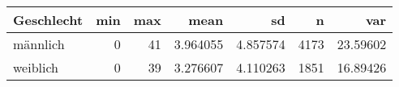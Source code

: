
\begin{tabular}{lrrrrrr}
\toprule
Geschlecht & min & max & mean & sd & n & var\\
\midrule
männlich & 0 & 41 & 3.964055 & 4.857574 & 4173 & 23.59602\\
weiblich & 0 & 39 & 3.276607 & 4.110263 & 1851 & 16.89426\\
\bottomrule
\end{tabular}